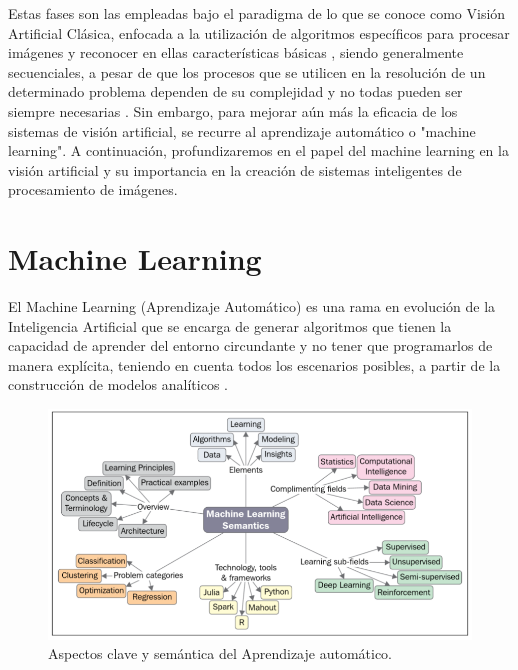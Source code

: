 Estas fases son las empleadas bajo el paradigma de lo que se conoce como Visión
Artificial Clásica, enfocada a la utilización de algoritmos específicos para procesar imágenes y reconocer en ellas características básicas \cite{Martinez22}, siendo generalmente secuenciales, a pesar de que los procesos que se utilicen en la resolución de un determinado problema dependen de su complejidad y no todas pueden ser siempre necesarias \cite{Santillan15}. Sin embargo, para mejorar aún más la eficacia de los sistemas de visión artificial, se recurre al aprendizaje automático o "machine learning". A continuación, profundizaremos en el papel del machine learning en la visión artificial y su importancia en la creación de sistemas inteligentes de procesamiento de imágenes. \\

\pagebreak

\section{Machine Learning}
\label{sec:MachineLearning} 

El Machine Learning (Aprendizaje Automático) es una rama en evolución de la Inteligencia Artificial que se encarga de generar algoritmos que tienen la capacidad de aprender del entorno circundante y no tener que programarlos de manera explícita, teniendo en cuenta todos los escenarios posibles, a partir de la construcción de modelos analíticos \cite{Sandoval18}.\\

 \begin{figure} [h!]
    \begin{center}
      \includegraphics[width=13cm]{figs/ML semantics.png}
    \end{center}
    \caption{Aspectos clave y semántica del Aprendizaje automático.}
    \label{fig:ML semantics}
\end{figure}

